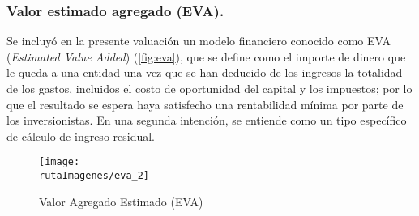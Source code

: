 \subsubsection{Valor estimado agregado (EVA).}

Se incluyó en la presente valuación un modelo financiero conocido como EVA (\textit{Estimated Value Added}) (\autoref{fig:eva}), que se define como el importe de dinero que le queda a una entidad una vez que se han deducido de los ingresos la totalidad de los gastos, incluidos el costo de oportunidad del capital y los impuestos; por lo que el resultado se espera haya satisfecho una rentabilidad mínima por parte de los inversionistas. En una segunda intención, se entiende como un tipo específico de cálculo de ingreso residual.

\begin{figure}[H]
\centering
\caption{Valor Agregado Estimado (EVA)\label{fig:eva}}

\texttt{[image: \\rutaImagenes/eva\_2]}
\end{figure}
